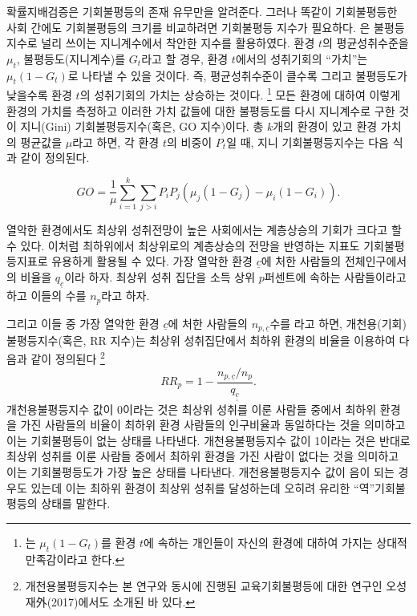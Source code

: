 확률지배검증은 기회불평등의 존재 유무만을 알려준다.
그러나 똑같이 기회불평등한 사회 간에도 기회불평등의 크기를 비교하려면 기회불평등 지수가 필요하다.
\citet{letl08}은 불평등 지수로 널리 쓰이는 지니계수에서 착안한 지수를 활용하였다.
환경 $t$의 평균성취수준을 $\mu _t$, 불평등도(지니계수)를 $G _t$라고 할 경우, 환경 $t$에서의 성취기회의 ``가치''는 $\mu _t (1-G _t)$로 나타낼 수 있을 것이다.
즉, 평균성취수준이 클수록 그리고 불평등도가 낮을수록 환경 $t$의 성취기회의 가치는 상승하는 것이다.
\footnote{\citet{yitzhaki79}는 $\mu _t (1-G _t)$를 환경 $t$에 속하는 개인들이 자신의 환경에 대하여 가지는 상대적 만족감이라고 한다.}
모든 환경에 대하여 이렇게 환경의 가치를 측정하고 이러한 가치 값들에 대한 불평등도를 다시 지니계수로 구한 것이 지니(Gini) 기회불평등지수(혹은, GO 지수)이다.
총 $k$개의 환경이 있고 환경 가치의 평균값을 $\mu$라고 하면, 각 환경 $t$의 비중이 $P_t$일 때, 지니 기회불평등지수는 다음 식과 같이 정의된다.

\begin{equation}
    G O=\frac{1}{\mu} \sum_{i=1}^{k} \sum_{j>i} P_{i} P_{j}\left(\mu_{j}\left(1-G_{j}\right)-\mu_{i}\left(1-G_{i}\right)\right).
    \label{eq:goms_GOI}
\end{equation}

열악한 환경에서도 최상위 성취전망이 높은 사회에서는 계층상승의 기회가 크다고 할 수 있다.
이처럼 최하위에서 최상위로의 계층상승의 전망을 반영하는 지표도 기회불평등지표로 유용하게 활용될 수 있다.
가장 열악한 환경 $\underline{c}$에 처한 사람들의 전체인구에서의 비율을 $q_{\underline{c}}$이라 하자.
최상위 성취 집단을 소득 상위 $p$퍼센트에 속하는 사람들이라고 하고 이들의 수를 $n_p$라고 하자.
 
그리고 이들 중 가장 열악한 환경 $\underline{c}$에 처한 사람들의 $n_{p,\underline{c}}$수를 라고 하면, 개천용(기회)불평등지수(혹은, RR 지수)는 최상위 성취집단에서 최하위 환경의 비율을 이용하여 다음과 같이 정의된다
\footnote{개천용불평등지수는 본 연구와 동시에 진행된 교육기회불평등에 대한 연구인 오성재外(2017)에서도 소개된 바 있다.}
\begin{equation}
    R R_{p}=1-\frac{n_{p, \underline{c}} / n_{p}}{q_{\underline{\underline{c}}}} .
    \label{eq:goms_RRI}
\end{equation}
개천용불평등지수 값이 0이라는 것은 최상위 성취를 이룬 사람들 중에서 최하위 환경을 가진 사람들의 비율이 최하위 환경 사람들의 인구비율과 동일하다는 것을 의미하고 이는 기회불평등이 없는 상태를 나타낸다.
 개천용불평등지수 값이 1이라는 것은 반대로 최상위 성취를 이룬 사람들 중에서 최하위 환경을 가진 사람이 없다는 것을 의미하고 이는 기회불평등도가 가장 높은 상태를 나타낸다.
 개천용불평등지수 값이 음이 되는 경우도 있는데 이는 최하위 환경이 최상위 성취를 달성하는데 오히려 유리한 ``역''기회불평등의 상태를 말한다.

